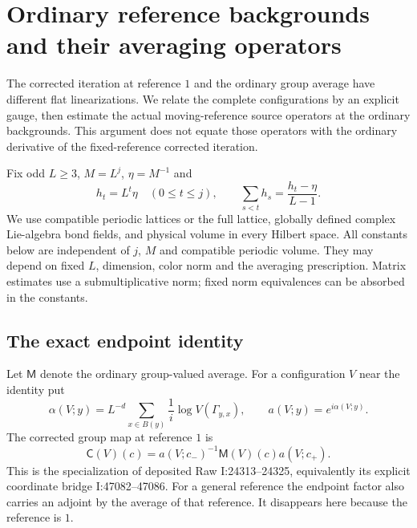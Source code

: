 
\section{Ordinary reference backgrounds and their averaging operators}
\label{nb-section}

The corrected iteration at reference $1$ and the ordinary group
average have different flat linearizations. We relate the complete
configurations by an explicit gauge, then estimate the actual
moving-reference source operators at the ordinary backgrounds.
This argument does not equate those operators with the ordinary
derivative of the fixed-reference corrected iteration.

Fix odd $L\ge3$, $M=L^j$, $\eta=M^{-1}$ and
\begin{equation}\label{nb-scales}
 h_t=L^t\eta\quad(0\le t\le j),\qquad
 \sum_{s<t}h_s=\frac{h_t-\eta}{L-1}.
\end{equation}
We use compatible periodic lattices or the full lattice, globally
defined complex Lie-algebra bond fields, and physical volume in
every Hilbert space. All constants below are independent of $j$,
$M$ and compatible periodic volume. They may depend on fixed
$L$, dimension, color norm and the averaging prescription.
Matrix estimates use a submultiplicative norm; fixed norm
equivalences can be absorbed in the constants.

\subsection{The exact endpoint identity}
\label{nb-source}

Let $\mathsf M$ denote the ordinary group-valued average. For a
configuration $V$ near the identity put
\begin{equation}\label{nb-endpoint-map}
 \alpha(V;y)=L^{-d}\sum_{x\in B(y)}\frac1i
                      \log V(\Gamma_{y,x}),\qquad
 a(V;y)=e^{i\alpha(V;y)}.
\end{equation}
The corrected group map at reference $1$ is
\begin{equation}\label{nb-corrected-map}
 \mathsf C(V)(c)
   =a(V;c_-)^{-1}\mathsf M(V)(c)a(V;c_+).
\end{equation}
This is the specialization of deposited Raw I:24313--24325,
equivalently its explicit coordinate bridge I:47082--47086.
For a general reference the endpoint factor also carries an
adjoint by the average of that reference. It disappears here
because the reference is $1$.

